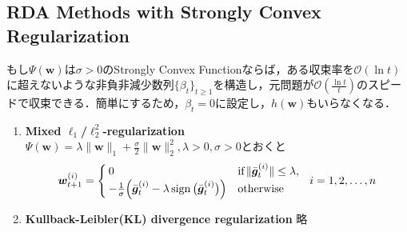 \documentclass[a4paper,11pt]{jsarticle}
\numberwithin{theorem}{section}  %
\numberwithin{equation}{section} %
\newcommand{\sign}{\mathop{\rm sign\,}\limits}
\begin{document}
\subsection{RDA Methods with Strongly Convex Regularization}
もし$\Psi(\bm{w})$は$\sigma > 0$のStrongly Convex Functionならば，ある収束率を$\mathcal{O}(\ln t)$に超えないような非負非減少数列$\{\beta_t\}_{t \ge 1}$を構造し，元問題が$\mathcal{O}(\frac{\ln t}{t})$のスピードで収束できる．簡単にするため，$\beta_t = 0$に設定し，$h(\bm{w})$もいらなくなる．
\begin{enumerate}
\item \textbf{Mixed $\ell_1$/$\ell_2^2$-regularization}\\
$\Psi(\bm{w}) = \lambda\|\bm{w}\|_1 + \frac{\sigma}{2}\|\bm{w}\|_2^2,\lambda>0,\sigma>0$とおくと
\begin{equation}
\bm{w}_{t+1}^{(i)} = \begin{cases}
0 & \text{if}\,\|\bar{\bm{g}}_t^{(i)}\| \le \lambda,\\
-\frac{1}{\sigma}\Bigr( \bar{\bm{g}}_t^{(i)} - \lambda \sign\bigr( \bar{\bm{g}}_t^{(i)} \bigr) \Bigr) & \text{otherwise}\\
\end{cases}
\,\,\,\,i=1,2,\dots,n
\end{equation}

\item \textbf{Kullback-Leibler(KL) divergence regularization} 略
\begin{comment}
$\Psi(\bm{w}) = \sigma D_{KL}(\bm{w}\|p)$，$\bm{w}$は標準単体，$p$は確率分布，$\sigma D_{KL}(\bm{w}\|p)$は次のように定義される．
\begin{equation}
D_{KL}(\bm{w}\|p) := \sum_{i=1}^n \bm{w}^{(i)}\ln\Bigr( \frac{\bm{w}^{(i)}}{p^{(i)}} \Bigr)
\end{equation}
\end{comment}

\end{enumerate}
\end{document}
